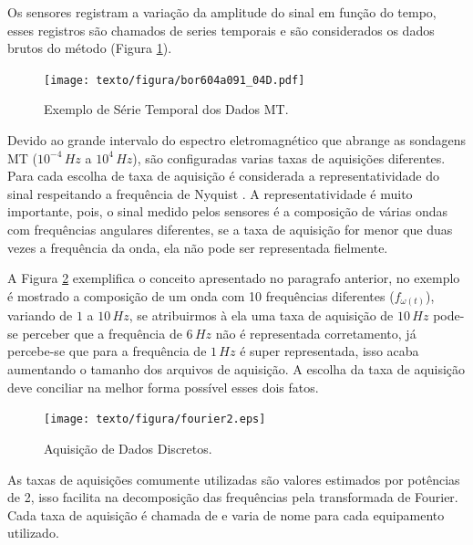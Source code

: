         Os sensores registram a variação da amplitude do sinal em função do tempo, esses registros são chamados de series temporais e são considerados os dados brutos do método (Figura \ref{serie-temporal}).
        
        \begin{figure}[H]
            \caption{Exemplo de Série Temporal dos Dados MT.}
                \begin{center}
                    \texttt{[image: texto/figura/bor604a091\_04D.pdf]}
                \end{center}
            \label{serie-temporal}
        \end{figure}
        
        Devido ao grande intervalo do espectro eletromagnético que abrange as sondagens MT ($10^{-4}\, Hz$ a $10^{4}\, Hz$), são configuradas varias taxas de aquisições diferentes. Para cada escolha de taxa de aquisição é considerada a representatividade do sinal respeitando a frequência de Nyquist \cite{nyquist28}. A representatividade é muito importante, pois, o sinal medido pelos sensores é a composição de várias ondas com frequências angulares diferentes, se a taxa de aquisição for menor que duas vezes a frequência da onda, ela não pode ser representada fielmente.  
        
        A Figura \ref{fig-aquisicao} exemplifica o conceito apresentado no paragrafo anterior, no exemplo é mostrado a composição de um onda com 10 frequências diferentes ($f_{\omega(t)}$), variando de $1$ a $10\, Hz$, se atribuirmos à ela uma taxa de aquisição de $10\,Hz$ pode-se perceber que a frequência de $6\,Hz$ não é representada corretamento, já percebe-se que para a frequência de $1\,Hz$ é super representada, isso acaba aumentando o tamanho dos arquivos de aquisição. A escolha da taxa de aquisição deve conciliar na melhor forma possível esses dois fatos.
        
        \begin{figure}[H]
            \caption{Aquisição de Dados Discretos.}
                \begin{center}
                    \texttt{[image: texto/figura/fourier2.eps]}
                \end{center}
            \label{fig-aquisicao}
        \end{figure}
    
        As taxas de aquisições comumente utilizadas são valores estimados por potências de 2, isso facilita na decomposição das frequências pela transformada de Fourier. Cada taxa de aquisição é chamada de  e varia de nome para cada equipamento utilizado. 
    
